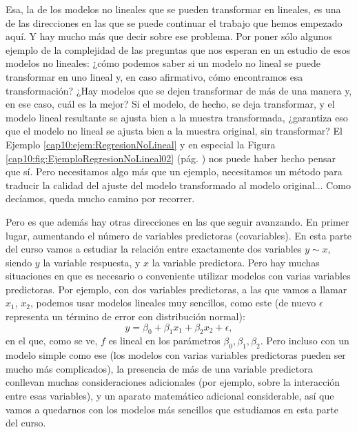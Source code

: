 Esa, la de los modelos no lineales que se pueden transformar en lineales, es una de las direcciones en las que se puede continuar el trabajo que hemos empezado aquí. Y hay mucho más que decir sobre ese problema. Por poner sólo algunos ejemplo de la complejidad de las preguntas que nos esperan en un estudio de esos modelos no lineales: ¿cómo podemos saber si un modelo no lineal se puede transformar en uno lineal y, en caso afirmativo, cómo encontramos esa transformación? ¿Hay modelos que se dejen transformar de más de una manera y, en ese caso, cuál es la mejor? Si el modelo, de hecho, se deja transformar, y el modelo lineal resultante se ajusta bien a la muestra transformada, ¿garantiza eso que el modelo no lineal se ajusta bien a la muestra original, sin transformar? El Ejemplo \ref{cap10:ejem:RegresionNoLineal} y en especial la Figura \ref{cap10:fig:EjemploRegresionNoLineal02} (pág. \pageref{cap10:fig:EjemploRegresionNoLineal02}) nos puede haber hecho pensar que sí. Pero necesitamos algo más que un ejemplo, necesitamos un método para traducir la calidad del ajuste del modelo transformado al modelo original... Como decíamos, queda mucho camino por recorrer.

Pero es que además hay otras direcciones en las que seguir avanzando. En primer lugar, aumentando el número de variables predictoras (covariables). En esta parte del curso vamos a estudiar la relación entre exactamente dos variables $y\sim x$, siendo $y$ la variable respuesta, y $x$ la variable predictora. Pero hay muchas situaciones en que es necesario o conveniente utilizar modelos con varias variables predictoras. Por ejemplo, con dos variables predictoras, a las que vamos a llamar $x_1$, $x_2$, podemos usar modelos lineales muy sencillos, como este (de nuevo $\epsilon$ representa un término de error con distribución normal):
\begin{equation}
\label{cap10:ecu:ModeloLinealDosVariables}
y= \beta_0+\beta_1 x_1+\beta_2 x_2 +\epsilon,
\end{equation}
en el que, como se ve, $f$ es lineal en los parámetros $\beta_0, \beta_1, \beta_2$.  Pero incluso con un modelo simple como ese (los modelos con varias variables predictoras pueden ser mucho más complicados), la presencia de más de una variable predictora conllevan muchas consideraciones adicionales (por ejemplo, sobre la {\sf interacción} entre esas variables), y un aparato matemático adicional considerable, así que vamos a quedarnos con los modelos más sencillos que estudiamos en esta parte del curso.

